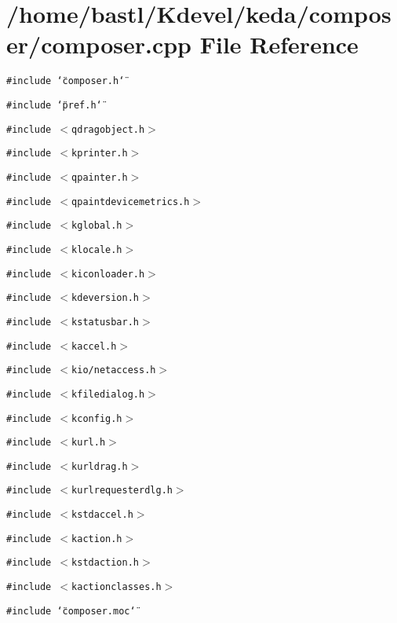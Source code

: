 \section{/home/bastl/Kdevel/keda/composer/composer.cpp File Reference}
\label{composer_8cpp}
{\tt \#include \char`\"{}composer.h\char`\"{}}\par
{\tt \#include \char`\"{}pref.h\char`\"{}}\par
{\tt \#include $<$qdragobject.h$>$}\par
{\tt \#include $<$kprinter.h$>$}\par
{\tt \#include $<$qpainter.h$>$}\par
{\tt \#include $<$qpaintdevicemetrics.h$>$}\par
{\tt \#include $<$kglobal.h$>$}\par
{\tt \#include $<$klocale.h$>$}\par
{\tt \#include $<$kiconloader.h$>$}\par
{\tt \#include $<$kdeversion.h$>$}\par
{\tt \#include $<$kstatusbar.h$>$}\par
{\tt \#include $<$kaccel.h$>$}\par
{\tt \#include $<$kio/netaccess.h$>$}\par
{\tt \#include $<$kfiledialog.h$>$}\par
{\tt \#include $<$kconfig.h$>$}\par
{\tt \#include $<$kurl.h$>$}\par
{\tt \#include $<$kurldrag.h$>$}\par
{\tt \#include $<$kurlrequesterdlg.h$>$}\par
{\tt \#include $<$kstdaccel.h$>$}\par
{\tt \#include $<$kaction.h$>$}\par
{\tt \#include $<$kstdaction.h$>$}\par
{\tt \#include $<$kactionclasses.h$>$}\par
{\tt \#include \char`\"{}composer.moc\char`\"{}}\par
